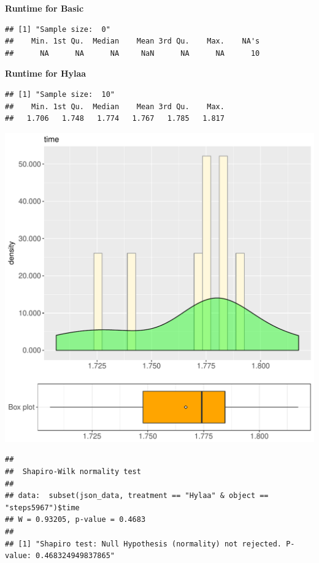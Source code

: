 \documentclass{article}\usepackage[]{graphicx}\usepackage[]{color}
\makeatletter
\def\maxwidth{ %
  \ifdim\Gin@nat@width>\linewidth
    \linewidth
  \else
    \Gin@nat@width
  \fi
}
\newenvironment{kframe}{%
 \def\at@end@of@kframe{}%
 \ifinner\ifhmode%
  \def\at@end@of@kframe{\end{minipage}}%
  \begin{minipage}{\columnwidth}%
 \fi\fi%
 \def\FrameCommand##1{\hskip\@totalleftmargin \hskip-\fboxsep
 \colorbox{shadecolor}{##1}\hskip-\fboxsep
     \hskip-\linewidth \hskip-\@totalleftmargin \hskip\columnwidth}%
 \MakeFramed {\advance\hsize-\width
   \@totalleftmargin\z@ \linewidth\hsize
   \@setminipage}}%
 {\par\unskip\endMakeFramed%
 \at@end@of@kframe}
\newenvironment{knitrout}{}{} %
\makeatother
\begin{document}
 \textbf{Runtime for Basic}
\begin{knitrout}
\color{fgcolor}\begin{kframe}
\begin{verbatim}
## [1] "Sample size:  0"
##    Min. 1st Qu.  Median    Mean 3rd Qu.    Max.    NA's 
##      NA      NA      NA     NaN      NA      NA      10
\end{verbatim}
\end{kframe}
\end{knitrout}
 \textbf{Runtime for Hylaa}
\begin{knitrout}
\color{fgcolor}\begin{kframe}
\begin{verbatim}
## [1] "Sample size:  10"
##    Min. 1st Qu.  Median    Mean 3rd Qu.    Max. 
##   1.706   1.748   1.774   1.767   1.785   1.817
\end{verbatim}
\end{kframe}
\includegraphics[width=\maxwidth]{figure/RH3_Hylaa_steps5967-1} 
\begin{kframe}\begin{verbatim}
## 
## 	Shapiro-Wilk normality test
## 
## data:  subset(json_data, treatment == "Hylaa" & object == "steps5967")$time
## W = 0.93205, p-value = 0.4683
## 
## [1] "Shapiro test: Null Hypothesis (normality) not rejected. P-value: 0.468324949837865"
\end{verbatim}
\end{kframe}
\end{knitrout}
  
\end{document}
